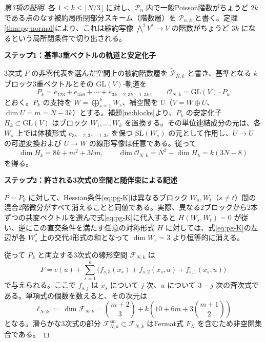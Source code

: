 \begin{proof}[第3項の証明]
各 $1\le k\le\lfloor N/3\rfloor$ に対し、$\mathscr P_n$ 内で一般Poisson階数がちょうど $2k$ である点のなす被約局所閉部分スキーム（階数層）を $\mathscr P_{n,k}$ と書く。定理\ref{thm:pg-normal}により、これは縮約写像 $\bigwedge^2V^*\to V$ の階数がちょうど $3k$ になるという局所閉条件で切り出される。

\par\medskip\noindent\textbf{ステップ1：基準3重ベクトルの軌道と安定化子}\par\nobreak\smallskip
3次式 $F$ の非零代表を選んだ空間上の被約階数層を $\widetilde{\mathscr P}_{N,k}$ と書き、基準となる $k$ ブロック3重ベクトルとその $\mathrm{GL}(V)$-軌道を
\begin{equation}
P_k=e_{123}+e_{456}+\cdots+e_{3k-2,3k-1,3k},\qquad
 \mathcal O_{N,k}=\mathrm{GL}(V)\cdot P_k
\end{equation}
とおく。$P_k$ の支持を $W=\bigoplus_{s=1}^k W_s$、補空間を $U$（$V=W\oplus U$、$\dim U=m=N-3k$）とする。補題\ref{ne:blocks}より、$P_k$ の安定化子 $H_k\subset\mathrm{GL}(V)$ はブロック $W_1,\ldots,W_k$ を置換する。その単位連結成分の元は、各 $W_s$ 上では体積形式 $e_{3s-2,3s-1,3s}$ を保つ $\mathrm{SL}(W_s)$ の元として作用し、$U\to U$ の可逆変換および $U\to W$ の線形写像は任意である。従って
\begin{equation}
 \dim H_k=8k+m^2+3km,\qquad
 \dim\mathcal O_{N,k}=N^2-\dim H_k=k(3N-8)
\end{equation}
を得る。

\par\medskip\noindent\textbf{ステップ2：許される3次式の空間と随伴束による記述}\par\nobreak\smallskip
$P=P_k$ に対して、Hessian条件\eqref{eq:pg-K}は異なるブロック $W_s,W_t$（$s\ne t$）間の混合2階微分がすべて消えることと同値である。実際、異なる2ブロックから2本ずつの共変ベクトルを選んで式\eqref{eq:pg-K}に代入すると $H(W_s,W_t)=0$ が従い、逆にこの直交条件を満たす任意の対称形式 $H$ に対しては、式\eqref{eq:pg-K}の左辺が各 $W_s^*$ 上の交代4形式の和となって $\dim W_s=3$ より恒等的に消える。

従って $P_k$ と両立する3次式の線形空間 $\mathcal F_{N,k}$ は
\begin{equation}
F=c(u)+\sum_{s=1}^k
 \bigl(f_{s,3}(x_s)+f_{s,2}(x_s,u)+f_{s,1}(x_s,u)\bigr)
\end{equation}
で与えられる。ここで $f_{s,j}$ は $x_s$ について $j$ 次、$u$ について $3-j$ 次の斉次式である。単項式の個数を数えると、その次元は
\begin{equation}
\ell_{N,k}:=\dim\mathcal F_{N,k}
=\binom{m+2}{3}+k\left(10+6m+3\binom{m+1}{2}\right)
\end{equation}
となる。滑らかな3次式の部分 $\mathcal F_{N,k}^{\mathrm{sm}}\subset\mathcal F_{N,k}$ はFermat式 $F_N$ を含むため非空開集合である。


\end{proof}

